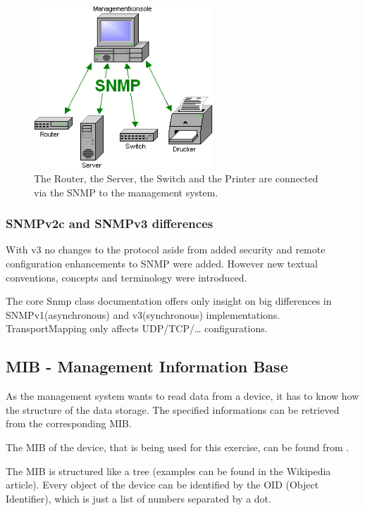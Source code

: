 \documentclass[11pt, a4paper]{article}
\begin{document}
\begin{figure}[h!]
	\centering
	\includegraphics[width=0.6\textwidth]{images/SNMP-Managementkonsole.png}
	\caption{The Router, the Server, the Switch and the Printer are connected via the SNMP to the management system.}
\end{figure}



\subsubsection{SNMPv2c and SNMPv3 differences}

With v3 no changes to the protocol aside from added security and remote configuration enhancements to SNMP were added. However new textual conventions, concepts and terminology were introduced.

The core Snmp class documentation \cite{SNMP4JDoc} offers only insight on big differences in SNMPv1(asynchronous) and v3(synchronous) implementations. TransportMapping only affects UDP/TCP/… configurations.

\subsection{MIB - Management Information Base}
As the management system wants to read data from a device, it has to know how the structure of the data storage. The specified informations can be retrieved from the corresponding MIB. 

The MIB of the device, that is being used for this exercise, can be found from \cite{MIBDownload}.

The MIB is structured like a tree (examples can be found in the Wikipedia article). Every object of the device can be identified by the OID (Object Identifier), which is just a list of numbers separated by a dot.
\end{document}
